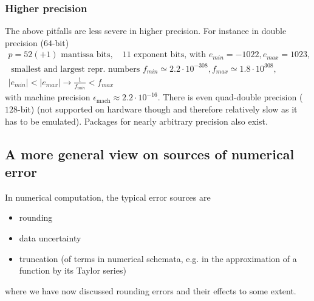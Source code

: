 \subsubsection{Higher precision}
The above pitfalls are less severe in higher precision. For instance in double precision ($64$-bit)
\begin{equation}
    \begin{multlined}
        p = 52(+1) \text{ mantissa bits}, \quad 11 \text{ exponent bits, with } e_{min} = -1022, e_{max} = 1023,\\ \text{ smallest and largest repr. numbers } f_{min} \simeq 2.2 \cdot 10^{-308}, f_{max} \simeq 1.8 \cdot 10^{308},\\ |e_{min}| < |e_{max}| \rightarrow \frac{1}{f_{min}} < f_{max}
    \end{multlined}
\end{equation}
with machine precision $\epsilon_{\text{mach}} \approx 2.2 \cdot 10^{-16}$. There is even quad-double precision ($128$-bit) (not supported on hardware though and therefore relatively slow as it has to be emulated). Packages for nearly arbitrary precision also exist.

\subsection{A more general view on sources of numerical error}
In numerical computation, the typical error sources are
\begin{itemize}
    \item rounding
    \item data uncertainty
    \item truncation (of terms in numerical schemata, e.g. in the approximation of a function by its Taylor series)
\end{itemize}
where we have now discussed rounding errors and their effects to some extent.

